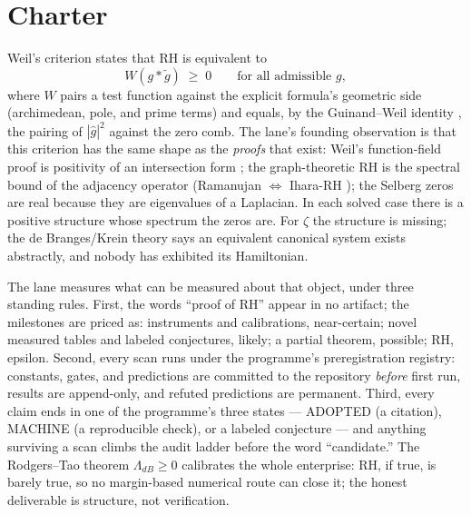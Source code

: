 \documentclass[11pt]{article}
\theoremstyle{remark}
\begin{document}
\begin{abstract}
arithmetic-free two-interval equilibrium of the spectral gap (earned out of sample), its deviation
from that universal is a pure density effect (the smooth comb reproduces it to $0.02$--$0.22$), and
the primes themselves are legible in the Jacobi coefficients by committed matched filters --- every
gated frequency detected with null off-prime controls --- though the committed explicit-formula
amplitude law was refuted: the transfer attenuates with frequency, and a final two-window test
confirmed the attenuation weakens as the zeros densify ($0.92 \to 0.98$ at $\ln 2$), identifying the
explicit-formula amplitudes as the dense-sampling limit. The note prices its own ambitions honestly:
the mechanisms are classical, the tables and the discipline are the contribution, and no progress on
RH itself is claimed.
\end{abstract}

\section{Charter}

Weil's criterion \cite{Weil52,Bombieri} states that RH is equivalent to
\[
W(g * \tilde g) \;\ge\; 0 \qquad \text{for all admissible } g,
\]
where $W$ pairs a test function against the explicit formula's geometric side (archimedean, pole,
and prime terms) and equals, by the Guinand--Weil identity \cite{Guinand,Weil52}, the pairing of
$|\hat g|^2$ against the zero comb. The lane's founding observation is that this criterion has the
same shape as the \emph{proofs} that exist: Weil's function-field proof is positivity of an
intersection form \cite{WeilFF}; the graph-theoretic RH is the spectral bound of the adjacency
operator (Ramanujan $\Leftrightarrow$ Ihara-RH \cite{Ihara,Terras,LPS}); the Selberg zeros are real
because they are eigenvalues of a Laplacian. In each solved case there is a positive structure whose
spectrum the zeros are. For $\zeta$ the structure is missing; the de Branges/Krein theory
\cite{deBranges,Remling} says an equivalent canonical system exists abstractly, and nobody has
exhibited its Hamiltonian.

The lane measures what can be measured about that object, under three standing rules. First, the
words ``proof of RH'' appear in no artifact; the milestones are priced as: instruments and
calibrations, near-certain; novel measured tables and labeled conjectures, likely; a partial
theorem, possible; RH, epsilon. Second, every scan runs under the programme's preregistration
registry: constants, gates, and predictions are committed to the repository \emph{before} first run,
results are append-only, and refuted predictions are permanent. Third, every claim ends in one of
the programme's three states --- ADOPTED (a citation), MACHINE (a reproducible check), or a labeled
conjecture --- and anything surviving a scan climbs the audit ladder before the word ``candidate.''
The Rodgers--Tao theorem $\Lambda_{dB} \ge 0$ \cite{RodgersTao} calibrates the whole enterprise: RH,
if true, is barely true, so no margin-based numerical route can close it; the honest deliverable is
structure, not verification.
\end{document}

